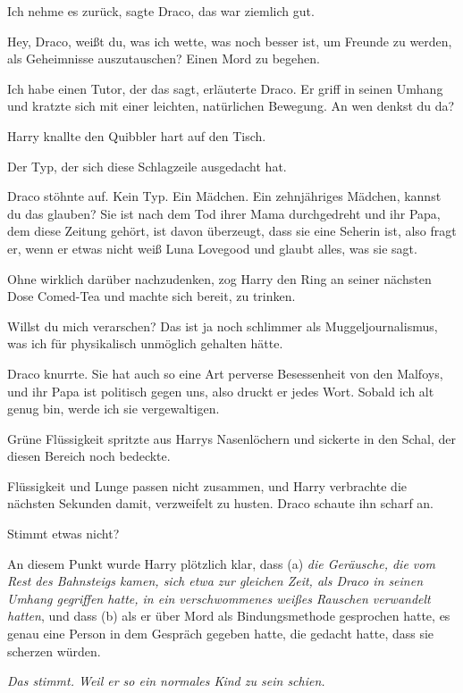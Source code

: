 \glqq{}Ich nehme es zurück\grqq{}, sagte Draco, \glqq{}das war ziemlich
gut.\grqq{}

\glqq{}Hey, Draco, weißt du, was ich wette, was noch besser ist, um Freunde zu
werden, als Geheimnisse auszutauschen? Einen Mord zu begehen.\grqq{}

\glqq{}Ich habe einen Tutor, der das sagt\grqq{}, erläuterte Draco. Er griff in
seinen Umhang und kratzte sich mit einer leichten, natürlichen Bewegung. \glqq{}
An wen denkst du da?\grqq{}

Harry knallte den Quibbler hart auf den Tisch.

\glqq{}Der Typ, der sich diese Schlagzeile ausgedacht hat.\grqq{}

Draco stöhnte auf. \glqq{}Kein Typ. Ein Mädchen. Ein zehnjähriges Mädchen,
kannst du das glauben? Sie ist nach dem Tod ihrer Mama durchgedreht und ihr
Papa, dem diese Zeitung gehört, ist davon überzeugt, dass sie eine Seherin ist,
also fragt er, wenn er etwas nicht weiß Luna Lovegood und glaubt alles, was sie
sagt.\grqq{}

Ohne wirklich darüber nachzudenken, zog Harry den Ring an seiner nächsten Dose
Comed-Tea und machte sich bereit, zu trinken.

\glqq{}Willst du mich verarschen? Das ist ja noch schlimmer als
Muggeljournalismus, was ich für physikalisch unmöglich gehalten hätte.\grqq{}

Draco knurrte. \glqq{}Sie hat auch so eine Art perverse Besessenheit von den
Malfoys, und ihr Papa ist politisch gegen uns, also druckt er jedes Wort.
Sobald ich alt genug bin, werde ich sie vergewaltigen.\grqq{}

Grüne Flüssigkeit spritzte aus Harrys Nasenlöchern und sickerte in den Schal,
der diesen Bereich noch bedeckte.

Flüssigkeit und Lunge passen nicht zusammen, und Harry verbrachte die nächsten
Sekunden damit, verzweifelt zu husten. Draco schaute ihn scharf an.

\glqq{}Stimmt etwas nicht?\grqq{}

An diesem Punkt wurde Harry plötzlich klar, dass (a) \emph{die Geräusche, die
vom Rest des Bahnsteigs kamen, sich etwa zur gleichen Zeit, als Draco in seinen
Umhang gegriffen hatte, in ein verschwommenes weißes Rauschen verwandelt
hatten}, und dass (b) als er über Mord als Bindungsmethode gesprochen hatte, es
genau eine Person in dem Gespräch gegeben hatte, die gedacht hatte, dass sie
scherzen würden.

\emph{Das stimmt. Weil er so ein normales Kind zu sein schien.}

